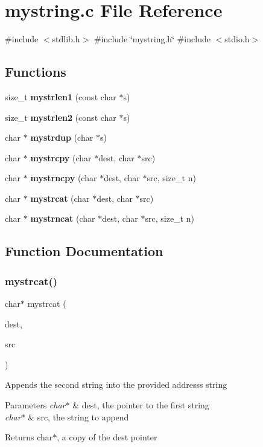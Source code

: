 \section{mystring.\+c File Reference}
\label{mystring_8c}
{\ttfamily \#include $<$stdlib.\+h$>$}\newline
{\ttfamily \#include \char`\"{}mystring.\+h\char`\"{}}\newline
{\ttfamily \#include $<$stdio.\+h$>$}\newline
\subsection*{Functions}
\begin{DoxyCompactItemize}
\item 
size\+\_\+t \textbf{ mystrlen1} (const char $\ast$s)
\item 
size\+\_\+t \textbf{ mystrlen2} (const char $\ast$s)
\item 
char $\ast$ \textbf{ mystrdup} (char $\ast$s)
\item 
char $\ast$ \textbf{ mystrcpy} (char $\ast$dest, char $\ast$src)
\item 
char $\ast$ \textbf{ mystrncpy} (char $\ast$dest, char $\ast$src, size\+\_\+t n)
\item 
char $\ast$ \textbf{ mystrcat} (char $\ast$dest, char $\ast$src)
\item 
char $\ast$ \textbf{ mystrncat} (char $\ast$dest, char $\ast$src, size\+\_\+t n)
\end{DoxyCompactItemize}


\subsection{Function Documentation}
\mbox{\label{mystring_8c_a68e51a014c7210b524d657b665d09db8}} 
\subsubsection{mystrcat()}
{\footnotesize\ttfamily char$\ast$ mystrcat (\begin{DoxyParamCaption}\item[{char $\ast$}]{dest,  }\item[{char $\ast$}]{src }\end{DoxyParamCaption})}

Appends the second string into the provided address\textquotesingle{}s string 
\begin{DoxyParams}{Parameters}
{\em char$\ast$} & dest, the pointer to the first string \\
\hline
{\em char$\ast$} & src, the string to append \\
\hline
\end{DoxyParams}
\begin{DoxyReturn}{Returns}
char$\ast$, a copy of the dest pointer 
\end{DoxyReturn}


